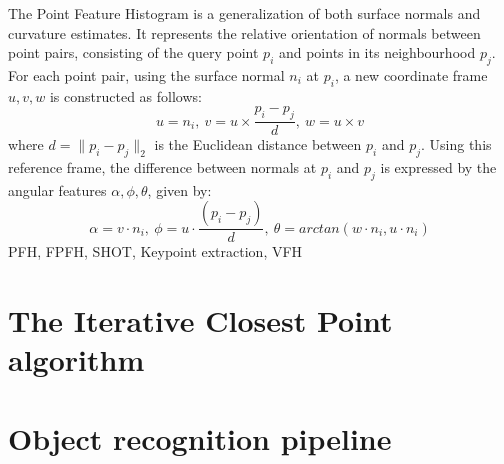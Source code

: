 The Point Feature Histogram is a generalization of both surface normals and curvature estimates. It represents the relative orientation of normals between point pairs, consisting of the query point $p_i$ and points in its neighbourhood $p_j$. For each point pair, using the surface normal $n_i$ at $p_i$, a new coordinate frame $u,v,w$ is constructed as follows:
\begin{equation}
u = n_i,\  v = u \times \frac{p_i-p_j}{d},\  w = u \times v
\end{equation}
where $d = \|p_i-p_j\|_2$ is the Euclidean distance between $p_i$ and $p_j$. Using this reference frame, the difference between normals at $p_i$ and $p_j$ is expressed by the angular features $\alpha, \phi, \theta$, given by:
\begin{equation}
\alpha = v \cdot n_i, \  \phi = u \cdot \frac{(p_i-p_j)}{d}, \ \theta = arctan(w\cdot n_i, u \cdot n_i)
\end{equation}
PFH, FPFH, SHOT,	Keypoint extraction, VFH


\section{The Iterative Closest Point algorithm}
\label{sec:icp}


\section{Object recognition pipeline}
\label{sec:pipeline}

